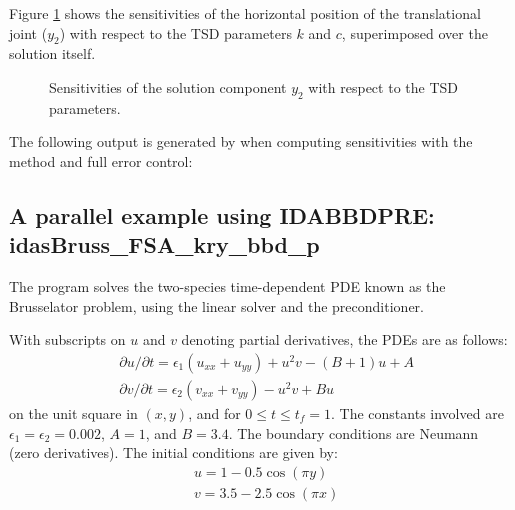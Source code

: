 Figure \ref{f:x2sensi} shows the sensitivities of the horizontal position of the
translational joint ($y_2$) with respect to the TSD parameters $k$ and $c$,
superimposed over the solution itself.
\begin{figure}[h]
  {\centerline{}}
  \caption{Sensitivities of the solution component $y_2$ with respect to the TSD parameters.}
  \label{f:x2sensi}
\end{figure}

The following output is generated by  when computing
sensitivities with the  method and full error control:




\subsection{A parallel example using IDABBDPRE: idasBruss\_FSA\_kry\_bbd\_p}
\label{ss:idasBruss_FSA_kry_bbd_p}

The  program solves the two-species time-dependent
PDE known as the Brusselator problem, using the {\idaspgmr} linear solver and the
{\idabbdpre} preconditioner.

With subscripts on $u$ and $v$ denoting partial derivatives, the PDEs
are as follows:
\begin{equation*}
\begin{split}
  &\partial u / \partial t = \epsilon_1 (u_{xx} + u_{yy})
                              + u^2 v - (B + 1) u + A \\
  &\partial v / \partial t = \epsilon_2 (v_{xx} + v_{yy})
                              - u^2 v + B  u
\end{split}
\end{equation*}
on the unit square in $(x,y)$, and for $0 \leq t \leq t_f = 1$.
The constants involved are $\epsilon_1 = \epsilon_2 = 0.002$, $A = 1$,
and $B = 3.4$.  The boundary conditions are Neumann (zero derivatives).
The initial conditions are given by:
\begin{equation*}
\begin{split}
  &u = 1 - 0.5 \cos(\pi y) \\
  &v = 3.5 - 2.5 \cos(\pi x)
\end{split}
\end{equation*}

